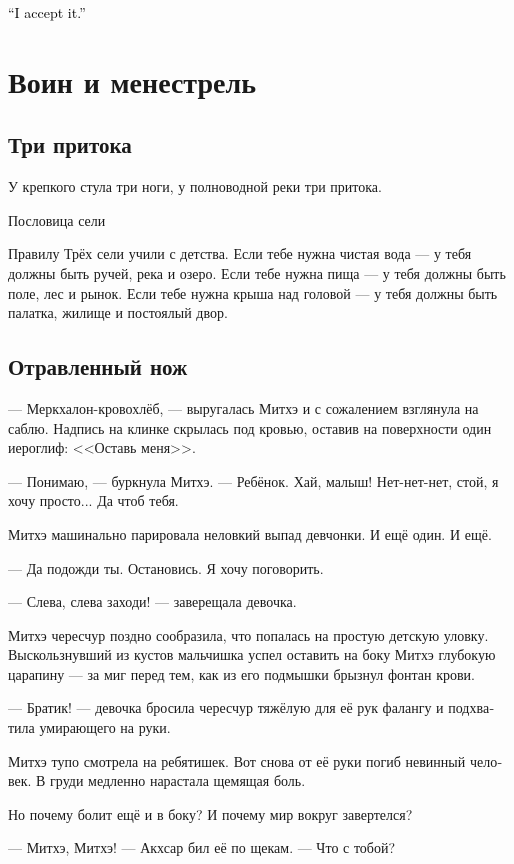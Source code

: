 \documentclass[a4paper,12pt,fleqn]{book}\usepackage{cooltooltips}\usepackage{polyglossia}\setdefaultlanguage[babelshorthands=true]{russian}\setotherlanguage{english}\defaultfontfeatures{Ligatures=TeX,Mapping=tex-text} \usepackage{xcolor}\definecolor{lightgray}{HTML}{bbbbbb}\color{lightgray}\newcommand{\ml}[3]{\textenglish{\textcolor{black}{#3}}}
\begin{document}
{\ml{$0$}
{--- Я согласна.}
{``I accept it.''}

\chapter{Воин и менестрель}

\section{Три притока}

\epigraph{У крепкого стула три ноги, у полноводной реки три притока.}
{Пословица сели}

Правилу Трёх сели учили с детства.
Если тебе нужна чистая вода --- у тебя должны быть ручей, река и озеро.
Если тебе нужна пища --- у тебя должны быть поле, лес и рынок.
Если тебе нужна крыша над головой --- у тебя должны быть палатка, жилище и постоялый двор.

\section{Отравленный нож}

--- Меркхалон-кровохлёб, --- выругалась Митхэ и с сожалением взглянула на саблю.
Надпись на клинке скрылась под кровью, оставив на поверхности один иероглиф: <<Оставь меня>>.

--- Понимаю, --- буркнула Митхэ.
--- Ребёнок.
Хай, малыш!
Нет-нет-нет, стой, я хочу просто...
Да чтоб тебя.

Митхэ машинально парировала неловкий выпад девчонки.
И ещё один.
И ещё.

--- Да подожди ты.
Остановись.
Я хочу поговорить.

--- Слева, слева заходи! --- заверещала девочка.

Митхэ чересчур поздно сообразила, что попалась на простую детскую уловку.
Выскользнувший из кустов мальчишка успел оставить на боку Митхэ глубокую царапину --- за миг перед тем, как из его подмышки брызнул фонтан крови.

--- Братик! --- девочка бросила чересчур тяжёлую для её рук фалангу и подхватила умирающего на руки.

Митхэ тупо смотрела на ребятишек.
Вот снова от её руки погиб невинный человек.
В груди медленно нарастала щемящая боль.

Но почему болит ещё и в боку?
И почему мир вокруг завертелся?

--- Митхэ, Митхэ! --- Акхсар бил её по щекам.
--- Что с тобой?

}
\end{document}
